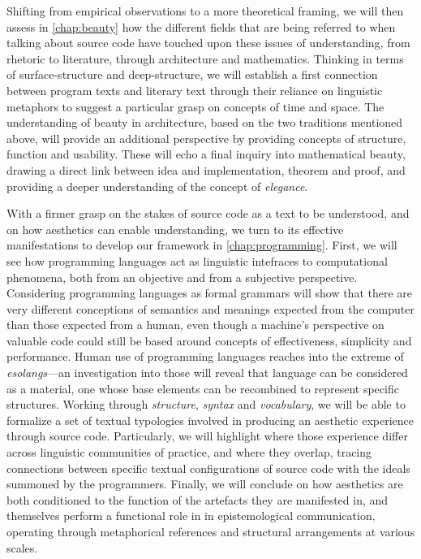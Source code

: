 Shifting from empirical observations to a more theoretical framing, we will then assess in \autoref{chap:beauty} how the different fields that are being referred to when talking about source code have touched upon these issues of understanding, from rhetoric to literature, through architecture and mathematics. Thinking in terms of surface-structure and deep-structure, we will establish a first connection between program texts and literary text through their reliance on linguistic metaphors to suggest a particular grasp on concepts of time and space. The understanding of beauty in architecture, based on the two traditions mentioned above, will provide an additional perspective by providing concepts of structure, function and usability. These will echo a final inquiry into mathematical beauty, drawing a direct link between idea and implementation, theorem and proof, and providing a deeper understanding of the concept of \emph{elegance}.

With a firmer grasp on the stakes of source code as a text to be understood, and on how aesthetics can enable understanding, we turn to its effective manifestations to develop our framework in \autoref{chap:programming}. First, we will see how programming languages act as linguistic intefraces to computational phenomena, both from an objective and from a subjective perspective. Considering programming languages as formal grammars will show that there are very different conceptions of semantics and meanings expected from the computer than those expected from a human, even though a machine's perspective on valuable code could still be based around concepts of effectiveness, simplicity and performance. Human use of programming languages reaches into the extreme of \emph{esolangs}—an investigation into those will reveal that language can be considered as a material, one whose base elements can be recombined to represent specific structures. Working through \emph{structure}, \emph{syntax} and \emph{vocabulary}, we will be able to formalize a set of textual typologies involved in producing an aesthetic experience through source code. Particularly, we will highlight where those experience differ across linguistic communities of practice, and where they overlap, tracing connections between specific textual configurations of source code with the ideals summoned by the programmers. Finally, we will conclude on how aesthetics are both conditioned to the function of the artefacts they are manifested in, and themselves perform a functional role in in epistemological communication, operating through metaphorical references and structural arrangements at various scales.

